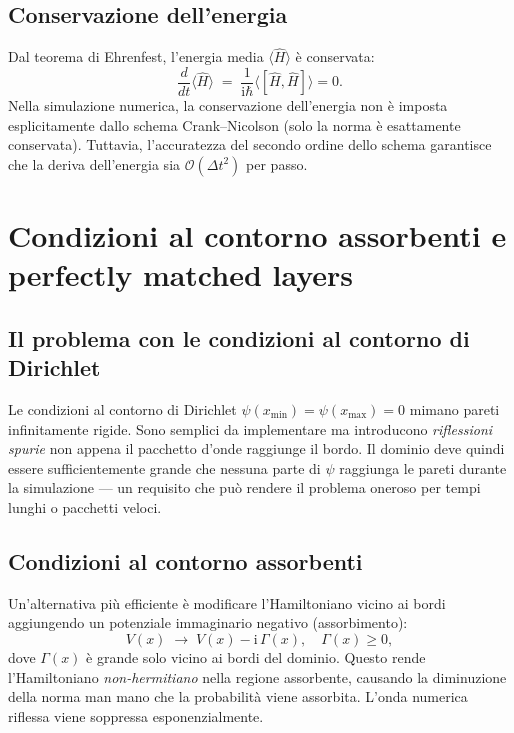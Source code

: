 \documentclass[12pt, a4paper]{article}
\newcommand{\dt}{\Delta t}
\newcommand{\ii}{\mathrm{i}}          %
\newcommand{\CN}{Crank--Nicolson}
\begin{document}
\subsection{Conservazione dell'energia}

Dal teorema di Ehrenfest, l'energia media $\langle\hat{H}\rangle$ è
conservata:
\begin{equation}
  \frac{d}{dt}\langle\hat{H}\rangle \;=\;
  \frac{1}{\ii\hbar}\langle[\hat{H},\hat{H}]\rangle = 0.
\end{equation}
Nella simulazione numerica, la conservazione dell'energia non è imposta
esplicitamente dallo schema \CN{} (solo la norma è esattamente conservata).
Tuttavia, l'accuratezza del secondo ordine dello schema garantisce che
la deriva dell'energia sia $\mathcal{O}(\dt^2)$ per passo.

\section{Condizioni al contorno assorbenti e perfectly matched layers}
\label{app:abc}

\subsection{Il problema con le condizioni al contorno di Dirichlet}

Le condizioni al contorno di Dirichlet $\psi(x_\text{min}) = \psi(x_\text{max}) = 0$
mimano pareti infinitamente rigide. Sono semplici da implementare ma introducono
\emph{riflessioni spurie} non appena il pacchetto d'onde raggiunge il bordo.
Il dominio deve quindi essere sufficientemente grande che nessuna parte di
$\psi$ raggiunga le pareti durante la simulazione — un requisito che può
rendere il problema oneroso per tempi lunghi o pacchetti veloci.

\subsection{Condizioni al contorno assorbenti}

Un'alternativa più efficiente è modificare l'Hamiltoniano vicino ai bordi
aggiungendo un potenziale immaginario negativo (assorbimento):
\begin{equation}
  V(x) \;\to\; V(x) - \ii\,\Gamma(x),
  \quad \Gamma(x) \geq 0,
\end{equation}
dove $\Gamma(x)$ è grande solo vicino ai bordi del dominio. Questo rende
l'Hamiltoniano \emph{non-hermitiano} nella regione assorbente, causando
la diminuzione della norma man mano che la probabilità viene assorbita.
L'onda numerica riflessa viene soppressa esponenzialmente.
\end{document}
